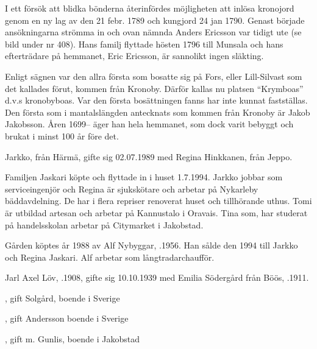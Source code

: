 I ett försök att blidka bönderna återinfördes möjligheten att inlösa kronojord genom en ny lag av den 21 febr. 1789 och kungjord 24 jan 1790. Genast började ansökningarna strömma in och ovan nämnda Anders Ericsson var tidigt ute (se bild under nr 408). Hans familj flyttade hösten 1796 till Munsala och hans efterträdare på hemmanet, Eric Ericsson, är sannolikt ingen släkting.


Enligt sägnen var den allra första som bosatte sig på Fors, eller Lill-Silvast som det kallades förut, kommen från Kronoby. Därför  kallas nu platsen ``Krymboas'' d.v.s kronobyboas. Var den första bosättningen fanns har inte kunnat fastställas. Den första som i mantalslängden antecknats som kommen från Kronoby är Jakob Jakobsson. Åren 1699-- äger han hela hemmanet, som dock varit bebyggt och brukat i minst 100 år före det.






Jarkko,  från Härmä, gifte sig 02.07.1989 med Regina Hinkkanen,  från Jeppo.
\begin{jhchildren}
  \item {}
  \item {}
\end{jhchildren}

Familjen Jaskari köpte och flyttade in i huset 1.7.1994. Jarkko jobbar som serviceingenjör och Regina är sjukskötare och arbetar på Nykarleby bäddavdelning. De har i flera repriser renoverat huset och tillhörande uthus. Tomi är utbildad artesan och arbetar på Kannustalo i Oravais. Tina som, har studerat på handelsskolan arbetar på Citymarket i Jakobstad.


Gården köptes år 1988 av Alf Nybyggar, .1956. Han sålde den 1994 till Jarkko och Regina Jaskari. Alf arbetar som långtradarchaufför.


Jarl Axel Löv, .1908, gifte sig 10.10.1939 med Emilia Södergård från Böös, .1911.
\begin{jhchildren}
  \item {}, gift Solgård, boende i Sverige
  \item {}, gift Andersson boende i Sverige
  \item {}, gift m. Gunlis, boende i Jakobstad
\end{jhchildren}

